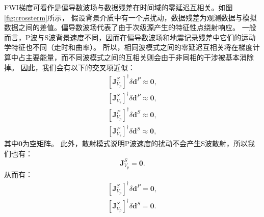 FWI梯度可看作是偏导数波场与数据残差在时间域的零延迟互相关\cite[]{pratt1998gauss}。如图\ref{fig:crossterm}所示，
假设背景介质中有一个点扰动，数据残差为观测数据与模拟数据之间的差值。偏导数波场代表了由于次级源产生的特征性点绕射响应。
一般而言，P波与S波背景速度不同，因而在偏导数波场和地震记录残差中它们的运动学特征也不同（走时和曲率）。
所以，相同波模式之间的零延迟互相关将在梯度计算中占主要能量，而不同波模式之间的互相关则会由于非同相的干涉被基本消除掉。
因此，我们会有以下的交叉项近似：
\begin{equation}
        \begin{split}
                [\mathbf{J}_{V_p}^{S}]^{\dagger}\delta \mathbf{d}^P\approx\mathbf{0},\\
                [\mathbf{J}_{V_s}^{S}]^{\dagger}\delta \mathbf{d}^P\approx\mathbf{0},\\
                [\mathbf{J}_{V_p}^{P}]^{\dagger}\delta \mathbf{d}^S\approx\mathbf{0},\\
                [\mathbf{J}_{V_s}^{P}]^{\dagger}\delta \mathbf{d}^S\approx\mathbf{0},
        \end{split}
        \label{eq:crossterms}
\end{equation}
其中$\mathbf{0}$为空矩阵。
此外，散射模式说明P波速度的扰动不会产生S波散射，所以我们也有：
\begin{equation}
\mathbf{J}^S_{V_p}=\mathbf{0}.
\label{eq:Jsvp}
\end{equation}
从而有：
\begin{equation}
        \begin{split}
[\mathbf{J}^S_{V_p}]^{\dagger}\delta \mathbf{d}^P=\mathbf{0}, \\
[\mathbf{J}^S_{V_p}]^{\dagger}\delta \mathbf{d}^S=\mathbf{0}.
        \end{split}
\label{eq:Jsvp1}
\end{equation}
